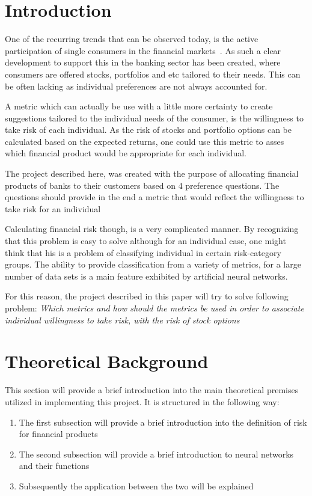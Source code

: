 \documentclass{article}
\begin{document}
\section{Introduction}
\label{sec:Introduction}

One of the recurring trends that can be observed today, is the active participation of single consumers in the financial markets~\cite{barasinska}. As such a clear development to support this in the banking sector has been created, where consumers are offered stocks, portfolios and etc tailored to their needs. This can be often lacking as individual preferences are not always accounted for.

A metric which can actually be use with a little more certainty to create suggestions tailored to the individual needs of the consumer, is the willingness to take risk of each individual. As the risk of stocks and portfolio options can be calculated based on the expected returns, one could use this metric to asses which financial product would be appropriate for each individual.

The project described here, was created with the purpose of allocating financial products of banks to their customers based on 4 preference questions. The questions should provide in the end a metric that would reflect the willingness to take risk for an individual

Calculating financial risk though, is a very complicated manner. By recognizing that this problem is easy to solve although for an individual case, one might think that his is a problem of classifying individual in certain risk-category groups. The ability to provide classification from a variety of metrics, for a large number of data sets is a main feature exhibited by artificial neural networks.

For this reason, the project described in this paper will try to solve following problem:
\textit{Which metrics and how should the metrics be used in order to associate individual willingness to take risk, with the risk of stock options}
\section{Theoretical Background}
\label{sec:theoretical_background}
This section will provide a brief introduction into the main theoretical premises utilized in implementing this project. It is structured in the following way:
\begin{enumerate}
    \item The first subsection will provide a brief introduction into the definition of risk for financial products
    \item The second subsection will provide a brief introduction to neural networks and their functions
    \item Subsequently the application between the two will be explained
\end{enumerate}
\end{document}
